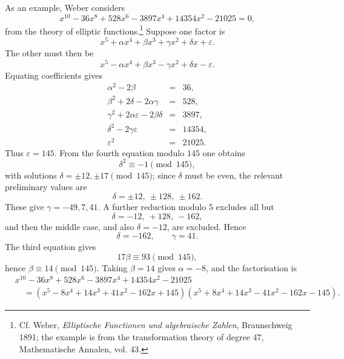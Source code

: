 \documentclass[11pt]{article}
\begin{document}
As an example, Weber considers
\[
        x^{10}-36x^8+528x^6-3897x^4+14354x^2-21025=0,
\]
from the theory of elliptic functions.\footnote{Cf. Weber, \emph{Elliptische Functionen und algebraische Zahlen}, Braunschweig 1891; the example is from the transformation theory of degree $47$, Mathematische Annalen, vol. 43.} Suppose one factor is
\[
        x^5+\alpha x^4+\beta x^3+\gamma x^2+\delta x+\varepsilon.
\]
The other must then be
\[
        x^5-\alpha x^4+\beta x^3-\gamma x^2+\delta x-\varepsilon.
\]
Equating coefficients gives
\[
\begin{array}{rcl}
\alpha^2-2\beta&=&36,\\
\beta^2+2\delta-2\alpha\gamma&=&528,\\
\gamma^2+2\alpha\varepsilon-2\beta\delta&=&3897,\\
\delta^2-2\gamma\varepsilon&=&14354,\\
\varepsilon^2&=&21025.
\end{array}
\]
Thus $\varepsilon=145$. From the fourth equation modulo $145$ one obtains
\[
        \delta^2\equiv -1\pmod{145},
\]
with solutions $\delta=\pm12,\pm17\pmod{145}$; since $\delta$ must be even, the relevant preliminary values are
\[
        \delta=\pm12,\ \pm128,\ \pm162.
\]
These give $\gamma=-49,7,41$. A further reduction modulo $5$ excludes all but
\[
        \delta=-12,\ +128,\ -162,
\]
and then the middle case, and also $\delta=-12$, are excluded. Hence
\[
        \delta=-162,\qquad \gamma=41.
\]
The third equation gives
\[
        17\beta\equiv93\pmod{145},
\]
hence $\beta\equiv14\pmod{145}$. Taking $\beta=14$ gives $\alpha=-8$, and the factorisation is
\[
\begin{aligned}
&x^{10}-36x^8+528x^6-3897x^4+14354x^2-21025\\
&\quad=(x^5-8x^4+14x^3+41x^2-162x+145)
       (x^5+8x^4+14x^3-41x^2-162x-145).
\end{aligned}
\]
\end{document}
